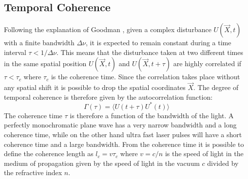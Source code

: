 \subsection{Temporal Coherence}
\label{sec:temp}
Following the explanation of Goodman \cite{goodman2015statistical}, given a complex disturbance $U(\overrightarrow{X},t)$ with a finite bandwidth $\Delta\nu $, it is expected to remain constant during a time interval $\tau<1/\Delta\nu$. This means that the disturbance taken at two different times in the same spatial position $U(\overrightarrow{X},t)$ and $U(\overrightarrow{X},t+\tau)$ are highly correlated if $\tau<\tau_c$ where $\tau_c$ is the coherence time. 
Since the correlation takes place without any spatial shift it is possible to drop the spatial coordinates $\overrightarrow{X}$. The degree of temporal coherence is therefore given by the autocorrelation function:
\begin{equation}
\label{eq:coherence1}
	\Gamma(\tau) =\langle U(t+\tau)U^*(t) \rangle
\end{equation}
The coherence time $\tau$ is therefore a function of the bandwidth of the light. A perfectly monochromatic plane wave has a very narrow bandwidth and a long coherence time, while on the other hand ultra fast laser pulses will have a short coherence time and a large bandwidth. From the coherence time it is possible to define the coherence length as $l_c= v\tau_c$ where $v=c/n$ is the speed of light in the medium of propagation given by the speed of light in the vacuum $c$ divided by the refractive index $n$.
